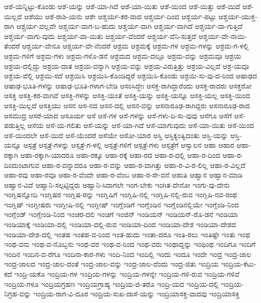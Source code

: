 ಆಶೆ-ಯನ್ನಿಟ್ಟು-ಕೊಂಡು
ಆಶೆ-ಯನ್ನು
ಆಶೆ-ಯಾ-ಗಿದೆ
ಆಶೆ-ಯಾ-ಯಿತು
ಆಶೆ-ಯಿಂದ
ಆಶೆ-ಯಿತ್ತು
ಆಶೆ-ಯಿದೆ
ಆಶೆ-ಯಿಲ್ಲದೆ
ಆಶೆಯು
ಆಶೆ-ರಾಶಿ-ಯನು
ಆಶೇ
ಆಶ್ಚರ್ಯ-ಕರ-ವಾದ
ಆಶ್ಚರ್ಯ-ದಿಂದ
ಆಶ್ಚರ್ಯ-ಪಟ್ಟು
ಆಶ್ಚರ್ಯ-ಯುಕ್ತ-ರಾಗಿ
ಆಶ್ಚರ್ಯ-ವಲ್ಲವೇ
ಆಶ್ಚರ್ಯ-ವಾಗ-ಬ-ಹುದು
ಆಶ್ಚರ್ಯ-ವಾಗಿ
ಆಶ್ಚರ್ಯ-ವಾಗಿದೆ
ಆಶ್ಚರ್ಯ-ವಾ-ಗುತ್ತಿದೆ
ಆಶ್ಚರ್ಯ-ವಾಗು-ವುದು
ಆಶ್ಚರ್ಯ-ವಾ-ಯಿತು
ಆಶ್ಚರ್ಯ-ವೆಂದರೆ
ಆಶ್ಚರ್ಯ-ವೆನಿ-ಸುತ್ತದೆ
ಆಶ್ಚರ್ಯ-ವೇ-ನಾಯಿ-ತೆಂದರೆ
ಆಶ್ಚರ್ಯ-ವೇನೂ
ಆಶ್ಚರ್ಯ-ವೇ-ನೆಂದರೆ
ಆಶ್ರಮ
ಆಶ್ರಮಕ್ಕೆ
ಆಶ್ರಮ-ಗಳ
ಆಶ್ರಮ-ಗಳನ್ನು
ಆಶ್ರಮ-ಗ-ಳಲ್ಲಿ
ಆಶ್ರಮ-ಗಳಿಗೆ
ಆಶ್ರಮ-ಗಳು
ಆಶ್ರಮ-ಗಳೊ-ಡನೆ
ಆಶ್ರಮದ
ಆಶ್ರಮ-ದಲ್ಲೂ
ಆಶ್ರಮ-ವನ್ನು
ಆಶ್ರಮವೂ
ಆಶ್ರಯ
ಆಶ್ರಯ-ದಲ್ಲಿದ್ದು
ಆಶ್ರಯ-ದಾತ
ಆಶ್ರಯ-ವನ್ನಾಗಿ
ಆಶ್ರಯ-ವನ್ನು
ಆಶ್ರಯ-ವಿರುತ್ತಿತ್ತು
ಆಶ್ರಯ-ವಿಲ್ಲದೆ
ಆಶ್ರ-ಯವೂ
ಆಶ್ರಯ-ವೆಲ್ಲಿ
ಆಶ್ರಯಿ-ಸದೆ
ಆಶ್ರಯಿಸಿ
ಆಶ್ರಯಿಸಿ-ಕೊಂಡಿದ್ದರೆ
ಆಶ್ರಯಿಸಿ-ಕೊಂಡು
ಆಶ್ರಯಿ-ಸು-ವು-ದ-ರಿಂದ
ಆಷಾಢದ
ಆಷಾಢ-ಭೂತಿ-ಗಳನ್ನು
ಆಷಾಢ-ಭೂತಿ-ಗಳಾಗ-ಬೇಡಿ
ಆಸಂಸಿದ್ಧೇಃ
ಆಸಕ್ತ-ರಾಗಿದ್ದಾರೆಂದು
ಆಸಕ್ತ-ರಾದರು
ಆಸಕ್ತರೋ
ಆಸಕ್ತಿ
ಆಸಕ್ತಿ-ಕರ-ವಾಗಿವೆ
ಆಸಕ್ತಿ-ಗಳನ್ನು
ಆಸಕ್ತಿ-ಯಂತೆ
ಆಸಕ್ತಿ-ಯನ್ನು
ಆಸಕ್ತಿ-ಯನ್ನೂ
ಆಸಕ್ತಿ-ಯಲ್ಲ
ಆಸಕ್ತಿ-ಯಿಂದ
ಆಸಕ್ತಿ-ಯಿಲ್ಲದೆ
ಆಸಕ್ತಿಯು
ಆಸನ
ಆಸ-ನದ
ಆಸನ-ದಲ್ಲಿ
ಆಸನ-ವನ್ನು
ಆಸನಾರೂಢ-ರಾಗಿದ್ದರು
ಆಸನಾರೂಢ-ರಾದ
ಆಸಮುದ್ರ
ಆಸರೆ-ಯಾದ
ಆಸೂರ್ಯ
ಆಸೆ
ಆಸೆ-ಗಳ
ಆಸೆ-ಗಳನ್ನು
ಆಸೆ-ಗಳು-ದಿ-ಸು-ವುವು
ಆಸೆಗೂ
ಆಸೆಗೆ
ಆಸೆ-ಪಡುತ್ತಿಲ್ಲ
ಆಸೆಯ
ಆಸೆ-ಯ-ಗಲಿತು
ಆಸೆ-ಯನ್ನು
ಆಸೆ-ಯಾ-ಗಿದೆ
ಆಸೆ-ಯಾಗುವುದು
ಆಸೆ-ಯಾ-ಯಿತು
ಆಸೆ-ಯಿಂದ
ಆಸೆ-ಯಿಂದಲೇ
ಆಸೆ-ಯಿದೆ
ಆಸೆ-ಯೆಂದರೆ
ಆಸೆಯೇ
ಆಸೋ-ಯಾರ
ಆಸ್ತಿ
ಆಸ್ತಿಕ್ಯಂತ್ವಿದಂತು
ಆಸ್ತಿ-ಯನ್ನು
ಆಸ್ತಿ-ಯನ್ನೂ
ಆಸ್ಪತ್ರೆ
ಆಸ್ಪತ್ರೆ-ಗಳನ್ನು
ಆಸ್ಪತ್ರೆ-ಗ-ಳಲ್ಲಿ
ಆಸ್ಪತ್ರೆ-ಗಳಿಗೆ
ಆಸ್ಪತ್ರೆ-ಗಳು
ಆಸ್ಪತ್ರೆಗೆ
ಆಸ್ವಾಲನ
ಆಹಾ
ಆಹಾರ
ಆಹಾ-ರಕ್ಕಾಗಿ
ಆಹಾ-ರಕ್ಕಾಗಿ-ಯಾದರೂ
ಆಹಾ-ರಕ್ಕೂ
ಆಹಾ-ರಕ್ಕೆ
ಆಹಾ-ರದ
ಆಹಾ-ರ-ದಲ್ಲಿ
ಆಹಾ-ರ-ದಿಂದ
ಆಹಾ-ರ-ದಿಂದುಂಟಾಗುವ
ಆಹಾ-ರ-ವನ್ನಾದರೂ
ಆಹಾ-ರ-ವನ್ನು
ಆಹಾ-ರ-ವಾಗಿತ್ತು
ಆಹಾ-ರ-ವಿ-ರ-ಲಿಲ್ಲ
ಆಹಾ-ರ-ವಿಲ್ಲದೆ
ಆಹಾ-ರವು
ಆಹಾ-ರವೂ
ಆಹಾ-ರ-ವೆಂದೇ
ಆಹಾ-ರ-ವೆಂಬ
ಆಹಾ-ರ-ಸೇ-ವನೆ
ಆಹುತಿ
ಆಹ್ವಾನ
ಆಹ್ವಾನ-ಮಾಡಿ
ಆಹ್ವಾನ-ವಿದೆ
ಆಹ್ವಾನಿ-ಸಲ್ಪಟ್ಟಿದ್ದರು
ಆಹ್ವಾನಿ-ಸಿದಾಗಲೇ
ಇಂಗ-ಬೇಕು
ಇಂಗಿತ-ವೇನೋ
ಇಂಗು-ವು-ದೇನು
ಇಂಗ್ಲಿಷನ್ನೋದಿ
ಇಂಗ್ಲಿಷರ
ಇಂಗ್ಲಿಷ-ರನ್ನು
ಇಂಗ್ಲಿಷಿಗೆ
ಇಂಗ್ಲಿಷಿ-ನಲ್ಲಿ
ಇಂಗ್ಲಿಷಿ-ನಲ್ಲಿ-ರುವ
ಇಂಗ್ಲಿಷಿ-ನವ-ರಂಥ
ಇಂಗ್ಲಿಷ್
ಇಂಗ್ಲೀಷರು
ಇಂಗ್ಲೀಷಿ-ನಲ್ಲಿ
ಇಂಗ್ಲೀಷ್
ಇಂಗ್ಲೆಂಡಿಗೆ
ಇಂಗ್ಲೆಂಡಿನ
ಇಂಗ್ಲೆಂಡಿನಲ್ಲಿಯೇ
ಇಂಗ್ಲೆಂಡಿ-ನಿಂದ
ಇಂಗ್ಲೆಂಡ್
ಇಂಗ್ಲೇಂಡಿ-ನಿಂದ
ಇಂಚರ-ದಲಿ
ಇಂಚಿಗೆ
ಇಂಜಿನ್
ಇಂಡಿಯನ್
ಇಂಡಿಯನ್‌-ರೊ-ಡನೆ
ಇಂಡಿಯಾ
ಇಂಡಿಯಾಕ್ಕೆ
ಇಂಡಿಯಾ-ದಲ್ಲಿ
ಇಂಡಿಯಾ-ದಲ್ಲಿ-ರುವ
ಇಂಡಿಯಾ-ದಿಂದ
ಇಂಡಿಯಾ-ದೇಶ
ಇಂಡಿಯಾ-ದೇಶದ
ಇಂಡಿಯಾ-ದೇಶ-ದಲ್ಲಿ
ಇಂತಹ
ಇಂತಹ-ವ-ರಿಂದ
ಇಂತ-ಹುದು
ಇಂತಾ-ದರೂ
ಇಂತಿ-ರಲು
ಇಂತಿಷ್ಟೇ
ಇಂತು
ಇಂಥ
ಇಂಥ-ವನು
ಇಂಥ-ವ-ನೊಬ್ಬನು
ಇಂಥ-ವರ
ಇಂಥ-ವ-ರಿಂದ
ಇಂಥ-ವರು
ಇಂಥಾದ್ದನ್ನು
ಇಂಥಿಂಥ
ಇಂದಿಗೂ
ಇಂದಿಗೆ
ಇಂದಿನ
ಇಂದಿನ-ವ-ರೆಗೂ
ಇಂದಿನಾ-ಕಾರ-ಗಳು
ಇಂದಿ-ನಿಂದ
ಇಂದಿಲ್ಲಿ
ಇಂದು
ಇಂದೂ
ಇಂದೇ
ಇಂದ್ರ
ಇಂದ್ರ-ಜಾಲ
ಇಂದ್ರ-ಜಾಲದ
ಇಂದ್ರ-ಜಾಲ-ದಂತೆ
ಇಂದ್ರ-ಜಾಲ-ವನ್ನು
ಇಂದ್ರ-ಜಾಲ-ವೆಂದು
ಇಂದ್ರ-ಜಿತು
ಇಂದ್ರಿಯ
ಇಂದ್ರಿಯ-ಕೆಟು-ಕದೆ
ಇಂದ್ರಿ-ಯಕೊ
ಇಂದ್ರಿಯ-ಗಳ
ಇಂದ್ರಿಯ-ಗಳನ್ನು
ಇಂದ್ರಿಯ-ಗಳನ್ನೇ
ಇಂದ್ರಿಯ-ಗಳಿ-ರುವ
ಇಂದ್ರಿಯ-ಗಳಿವೆ
ಇಂದ್ರಿಯ-ಗಳೂ
ಇಂದ್ರಿಯಗ್ರಹಣ
ಇಂದ್ರಿಯಗ್ರಾಹ್ಯ
ಇಂದ್ರಿಯ-ಜಿ-ತರೊ
ಇಂದ್ರಿ-ಯದ
ಇಂದ್ರಿಯ-ದಲ್ಲಿ
ಇಂದ್ರಿಯ-ನಿಗ್ರಹ-ವನ್ನು
ಇಂದ್ರಿಯ-ರಾಗ-ವಿ-ದೂರ
ಇಂದ್ರಿಯ-ಸುಖ-ದಾಸೆ-ಯನ್ನು
ಇಂದ್ರಿಯಾಸಕ್ತ-ವಾದವು
ಇಂದ್ರಿಯಾಸಕ್ತಿ
